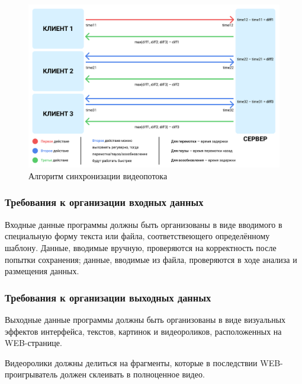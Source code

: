 \begin{figure}[p]
    \centering
    \includegraphics[width=0.97\linewidth]{../images/interaction_format.png}
    \caption{Алгоритм синхронизации видеопотока}
    \label{ris:interaction_format}
\end{figure}

\newpage

\subsubsection{Требования к организации входных данных}
Входные данные программы должны быть организованы в виде вводимого в специальную форму текста или файла,
соответствеющего определённому шаблону.
Данные, вводимые вручную, проверяются на корректность после попытки сохранения;
данные, вводимые из файла, проверяются в ходе анализа и размещения данных.

\subsubsection{Требования к организации выходных данных}
Выходные данные программы должны быть организованы в виде визуальных эффектов интерфейса, текстов, картинок и
видеороликов, расположенных на WEB-странице.

Видеоролики должны делиться на фрагменты, которые в последствии WEB-проигрыватель должен склеивать в полноценное видео.